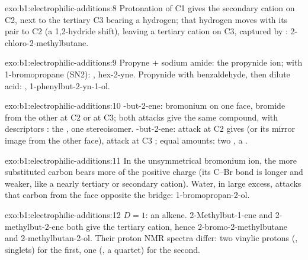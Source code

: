 \begin{solution}{exo:b1:electrophilic-additions:8}
Protonation of C1 gives the secondary cation on C2, next to the tertiary
C3 bearing a hydrogen; that hydrogen moves with its pair to C2 (a
1,2-hydride shift), leaving a tertiary cation on C3, captured by
: 2-chloro-2-methylbutane.
\end{solution}

\begin{solution}{exo:b1:electrophilic-additions:9}
Propyne + sodium amide: the propynide ion; with 1-bromopropane (SN2):
, hex-2-yne. Propynide with benzaldehyde, then dilute
acid: , 1-phenylbut-2-yn-1-ol.
\end{solution}

\begin{solution}{exo:b1:electrophilic-additions:10}
-but-2-ene: bromonium on one face, bromide from the other at C2
or at C3; both attacks give the same compound, with descriptors :
the , one stereoisomer. -but-2-ene: attack at C2 gives
 (or its mirror image from the other face), attack at C3
; equal amounts: two , a .
\end{solution}

\begin{solution}{exo:b1:electrophilic-additions:11}
In the unsymmetrical bromonium ion, the more substituted carbon bears more
of the positive charge (its C--Br bond is longer and weaker, like a nearly
tertiary or secondary cation). Water, in large excess, attacks that carbon
from the face opposite the bridge: 1-bromopropan-2-ol.
\end{solution}

\begin{solution}{exo:b1:electrophilic-additions:12}
$D = 1$: an alkene. 2-Methylbut-1-ene and 2-methylbut-2-ene both give the
tertiary cation, hence 2-bromo-2-methylbutane and 2-methylbutan-2-ol. Their
proton NMR spectra differ: two vinylic protons (, singlets) for
the first, one (, a quartet) for the second.
\end{solution}


